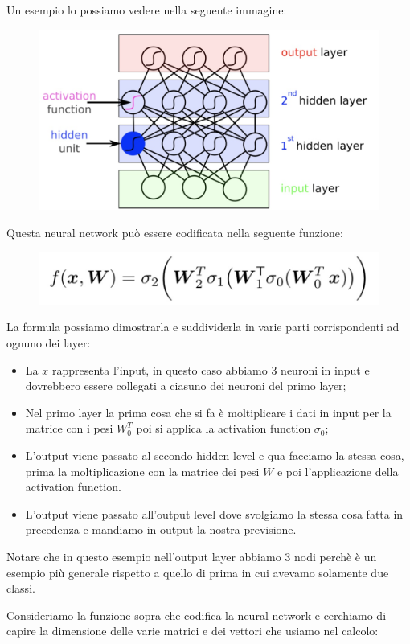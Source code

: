 \documentclass[14pt]{extreport}
\begin{document}
Un esempio lo possiamo vedere nella seguente immagine:

\begin{figure}[H]
\centering
\includegraphics[width=0.5\linewidth]{368.jpeg}
\end{figure}

Questa neural network può essere codificata nella seguente funzione:

\begin{figure}[H]
\centering
\includegraphics[width=0.7\linewidth]{369.jpeg}
\end{figure}


La formula possiamo dimostrarla e suddividerla in varie parti corrispondenti ad ognuno dei layer:
\begin{itemize}
\item La $x$ rappresenta l'input, in questo caso abbiamo 3 neuroni in input e dovrebbero essere collegati a ciasuno dei neuroni del primo layer;
\item Nel primo layer la prima cosa che si fa è moltiplicare i dati in input per la matrice con i pesi $W_0^T$ poi si applica la activation function
$\sigma_0$;
\item L'output viene passato al secondo hidden level e qua facciamo la stessa cosa, prima la moltiplicazione con la matrice dei pesi $W$ e poi
l'applicazione della activation function.
\item L'output viene passato all'output level dove svolgiamo la stessa cosa fatta in precedenza e mandiamo in output la nostra previsione.
\end{itemize}

Notare che in questo esempio nell'output layer abbiamo 3 nodi perchè è un esempio più generale rispetto a quello di prima in cui avevamo solamente due
classi.

Consideriamo la funzione sopra che codifica la neural network e cerchiamo di capire la dimensione delle varie matrici e dei vettori che usiamo nel
calcolo:
\end{document}
